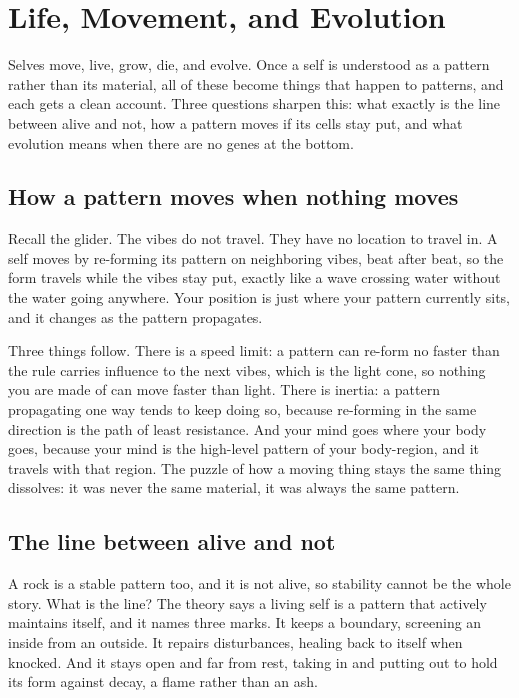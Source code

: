 \section{Life, Movement, and Evolution}

Selves move, live, grow, die, and evolve. Once a self is understood as a pattern rather than its material, all of these become things that happen to patterns, and each gets a clean account. Three questions sharpen this: what exactly is the line between alive and not, how a pattern moves if its cells stay put, and what evolution means when there are no genes at the bottom.

\subsection{How a pattern moves when nothing moves}

Recall the glider. The vibes do not travel. They have no location to travel in. A self moves by re-forming its pattern on neighboring vibes, beat after beat, so the form travels while the vibes stay put, exactly like a wave crossing water without the water going anywhere. Your position is just where your pattern currently sits, and it changes as the pattern propagates.

Three things follow. There is a speed limit: a pattern can re-form no faster than the rule carries influence to the next vibes, which is the light cone, so nothing you are made of can move faster than light. There is inertia: a pattern propagating one way tends to keep doing so, because re-forming in the same direction is the path of least resistance. And your mind goes where your body goes, because your mind is the high-level pattern of your body-region, and it travels with that region. The puzzle of how a moving thing stays the same thing dissolves: it was never the same material, it was always the same pattern.

\subsection{The line between alive and not}

A rock is a stable pattern too, and it is not alive, so stability cannot be the whole story. What is the line? The theory says a living self is a pattern that actively maintains itself, and it names three marks. It keeps a boundary, screening an inside from an outside. It repairs disturbances, healing back to itself when knocked. And it stays open and far from rest, taking in and putting out to hold its form against decay, a flame rather than an ash.


